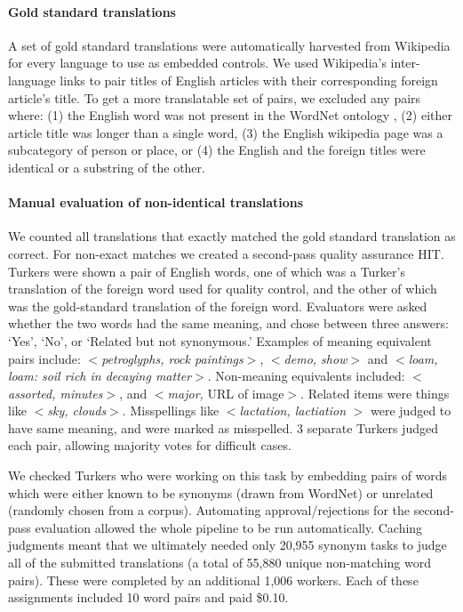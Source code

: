 \documentclass[11pt]{article}
\begin{document}
\paragraph{Gold standard translations} 
A set of gold standard translations were automatically harvested from Wikipedia  for every language to use as embedded controls. We used Wikipedia's inter-language links to pair titles of English articles with their corresponding foreign article's title.  To get a more translatable set of pairs, we excluded any pairs where: (1) the English word was not present in the WordNet ontology  \cite{miller1995wordnet}, (2) either article title was longer than a single word, (3) the English wikipedia page was a subcategory of person or place, or (4) the English and the foreign titles were identical or a substring of the other.

\paragraph{Manual evaluation of non-identical translations}
We counted all translations that exactly matched the gold standard translation as correct.  For non-exact matches we created a second-pass quality assurance HIT.  
Turkers were shown a pair of English words, one of which was a Turker's translation of the foreign word used for quality control, and the other of which was the gold-standard translation of the foreign word. Evaluators were asked whether the two words had the same meaning, and chose between three answers: `Yes', `No', or `Related but not synonymous.'  Examples of meaning equivalent pairs include: $<${\it petroglyphs, rock paintings}$>$, $<${\it demo, show}$>$ and  $<${\it loam, loam: soil rich in decaying matter}$>$.  Non-meaning equivalents included: $<${\it assorted, minutes}$>$, and $<${\it major,} URL of image$>$.  Related items were things like $<${\it sky, clouds}$>$. Misspellings like $<${\it lactation, lactiation} $>$ were judged to have same meaning, and were marked as misspelled.   3 separate Turkers judged each pair, allowing majority votes for difficult cases. 


We checked Turkers who were working on this task by embedding pairs of words which were either known to be synonyms (drawn from WordNet) or  unrelated (randomly chosen from a corpus). 
Automating approval/rejections for the second-pass evaluation allowed the whole pipeline to be run automatically.  Caching judgments meant that we ultimately needed only 
20,955 synonym tasks to judge all of the submitted translations (a total of 55,880 unique non-matching word pairs).  These were completed by an additional 1,006 workers.  Each of these assignments included 10 word pairs and paid \$0.10.
\end{document}

